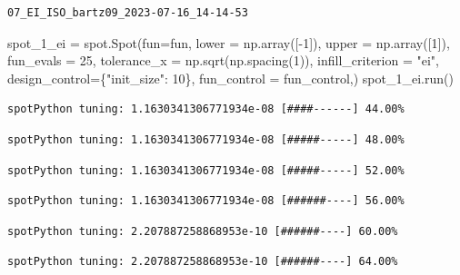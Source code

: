\documentclass[
  letterpaper,
  DIV=11,
  numbers=noendperiod]{scrreprt}
\newenvironment{Shaded}{\begin{snugshade}}{\end{snugshade}}
\newcommand{\DecValTok}[1]{\textcolor[rgb]{0.68,0.00,0.00}{#1}}
\newcommand{\NormalTok}[1]{\textcolor[rgb]{0.00,0.23,0.31}{#1}}
\newcommand{\OperatorTok}[1]{\textcolor[rgb]{0.37,0.37,0.37}{#1}}
\newcommand{\StringTok}[1]{\textcolor[rgb]{0.13,0.47,0.30}{#1}}
\begin{document}
\begin{verbatim}
07_EI_ISO_bartz09_2023-07-16_14-14-53
\end{verbatim}

\begin{Shaded}
\begin{Highlighting}[]
\NormalTok{spot\_1\_ei }\OperatorTok{=}\NormalTok{ spot.Spot(fun}\OperatorTok{=}\NormalTok{fun,}
\NormalTok{                   lower }\OperatorTok{=}\NormalTok{ np.array([}\OperatorTok{{-}}\DecValTok{1}\NormalTok{]),}
\NormalTok{                   upper }\OperatorTok{=}\NormalTok{ np.array([}\DecValTok{1}\NormalTok{]),}
\NormalTok{                   fun\_evals }\OperatorTok{=} \DecValTok{25}\NormalTok{,}
\NormalTok{                   tolerance\_x }\OperatorTok{=}\NormalTok{ np.sqrt(np.spacing(}\DecValTok{1}\NormalTok{)),}
\NormalTok{                   infill\_criterion }\OperatorTok{=} \StringTok{"ei"}\NormalTok{,}
\NormalTok{                   design\_control}\OperatorTok{=}\NormalTok{\{}\StringTok{"init\_size"}\NormalTok{: }\DecValTok{10}\NormalTok{\},}
\NormalTok{                   fun\_control }\OperatorTok{=}\NormalTok{ fun\_control,)}
\NormalTok{spot\_1\_ei.run()}
\end{Highlighting}
\end{Shaded}

\begin{verbatim}
spotPython tuning: 1.1630341306771934e-08 [####------] 44.00% 
\end{verbatim}

\begin{verbatim}
spotPython tuning: 1.1630341306771934e-08 [#####-----] 48.00% 
\end{verbatim}

\begin{verbatim}
spotPython tuning: 1.1630341306771934e-08 [#####-----] 52.00% 
\end{verbatim}

\begin{verbatim}
spotPython tuning: 1.1630341306771934e-08 [######----] 56.00% 
\end{verbatim}

\begin{verbatim}
spotPython tuning: 2.207887258868953e-10 [######----] 60.00% 
\end{verbatim}

\begin{verbatim}
spotPython tuning: 2.207887258868953e-10 [######----] 64.00% 
\end{verbatim}
\end{document}
